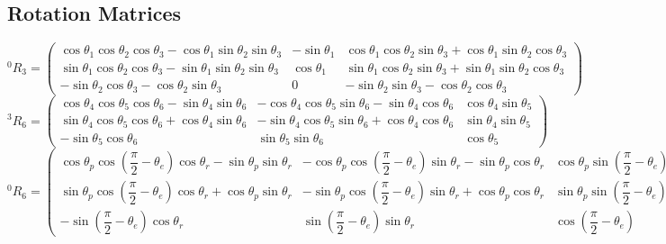 \documentclass{article}
\begin{document}
\subsection{Rotation Matrices}
\bigskip
$
^{0}R_{3} = 
\begin{pmatrix}
	\cos\theta_{1} \cos\theta_{2} \cos\theta_{3} - \cos\theta_{1} \sin\theta_{2} \sin\theta_{3}
	& -\sin\theta_{1} &
	\cos\theta_{1} \cos\theta_{2} \sin\theta_{3} + \cos\theta_{1} \sin\theta_{2} \cos\theta_{3} \\
	\sin\theta_{1} \cos\theta_{2} \cos\theta_{3} - \sin\theta_{1} \sin\theta_{2} \sin\theta_{3}
	& \cos\theta_{1} &
	\sin\theta_{1} \cos\theta_{2} \sin\theta_{3} + \sin\theta_{1} \sin\theta_{2} \cos\theta_{3} \\
	- \sin\theta_{2} \cos\theta_{3} - \cos\theta_{2} \sin\theta_{3}
	& 0 &
	- \sin\theta_{2} \sin\theta_{3} - \cos\theta_{2} \cos\theta_{3}
\end{pmatrix}
$
\bigskip\\
$
^{3}R_{6} = 
\begin{pmatrix}
	\cos\theta_{4} \cos\theta_{5} \cos\theta_{6} - \sin\theta_{4} \sin\theta_{6} &
	- \cos\theta_{4} \cos\theta_{5} \sin\theta_{6} - \sin\theta_{4} \cos\theta_{6} &
	\cos\theta_{4} \sin\theta_{5} \\
	
	\sin\theta_{4} \cos\theta_{5} \cos\theta_{6} + \cos\theta_{4} \sin\theta_{6} &
	- \sin\theta_{4} \cos\theta_{5} \sin\theta_{6} + \cos\theta_{4} \cos\theta_{6} &
	\sin\theta_{4} \sin\theta_{5} \\
	
	- \sin\theta_{5} \cos\theta_{6} &
	\sin\theta_{5} \sin\theta_{6} &
	\cos\theta_{5}
\end{pmatrix}
$
\bigskip\\
$
^{0}R_{6} = 
\begin{pmatrix}
	\cos\theta_{p} \cos(\dfrac{\pi}{2} - \theta_{e}) \cos\theta_{r} - \sin\theta_{p} \sin\theta_{r} &
	- \cos\theta_{p} \cos(\dfrac{\pi}{2} - \theta_{e}) \sin\theta_{r} - \sin\theta_{p} \cos\theta_{r} &
	\cos\theta_{p} \sin(\dfrac{\pi}{2} - \theta_{e}) \\
	
	\sin\theta_{p} \cos(\dfrac{\pi}{2} - \theta_{e}) \cos\theta_{r} + \cos\theta_{p} \sin\theta_{r} &
	- \sin\theta_{p} \cos(\dfrac{\pi}{2} - \theta_{e}) \sin\theta_{r} + \cos\theta_{p} \cos\theta_{r} &
	\sin\theta_{p} \sin(\dfrac{\pi}{2} - \theta_{e}) \\
	
	- \sin(\dfrac{\pi}{2} - \theta_{e}) \cos\theta_{r} &
	\sin(\dfrac{\pi}{2} - \theta_{e}) \sin\theta_{r} &
	\cos(\dfrac{\pi}{2} - \theta_{e})
\end{pmatrix}
$
\end{document}
